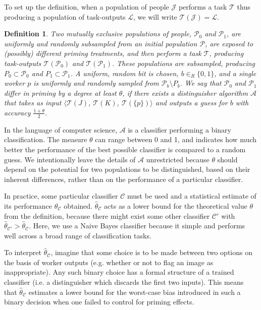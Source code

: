 \documentclass[letterpaper,twocolumn]{article}
\newtheorem*{mydef}{Definition}
\begin{document}
To set up the definition, when a population of people $\mathcal{J}$ performs
a task $\mathcal{T}$ thus producing a population of task-outputs $\mathcal{L}$,
we will write $\mathcal{T}(\mathcal{J}) = \mathcal{L}$.

\vspace{2mm}
\begin{mydef}
	\upshape
	Two mutually exclusive populations of people, $\mathcal{P}_0$ and 
	$\mathcal{P}_1$, are uniformly and randomly subsampled from an initial 
	population $\mathcal{P}$, are exposed to (possibly) different priming 
	treatments, and then perform a task $\mathcal{T}$, 
	producing task-outputs $\mathcal{T}(\mathcal{P}_0)$ and 
	$\mathcal{T}(\mathcal{P}_1)$.
	These populations are subsampled, producing 
	$P_0 \subset \mathcal{P}_0$ and
	$P_1 \subset \mathcal{P}_1$. A uniform, random bit is chosen, 
	$b\in _R \{0,1\}$, and a single worker $p$ is uniformly and randomly 
	sampled from 
	$\mathcal{P}_b \setminus P_b$.
	We say that $\mathcal{P}_0$ and $\mathcal{P}_1$ 
	\emph{differ in priming by a degree at least $\theta$},
	if there exists a \emph{distinguisher algorithm} $\mathcal{A}$ that takes as input 
	$\langle\mathcal{T}(J)$, $\mathcal{T}(K)$, $\mathcal{T}(\{p\})\rangle$
	and outputs a guess for $b$ with accuracy $\frac{1+\theta}{2}$.  
\end{mydef}

In the language of computer science, $\mathcal{A}$ is a classifier performing
a binary classification.  The measure $\theta$ can range between 0 and 1, and 
indicates how much better the performance of the best possible classifier is 
compared to a random guess. We intentionally leave the details of 
$\mathcal{A}$ unrestricted because $\theta$ should depend on the potential 
for two populations to be distinguished, based on their inherent differences, 
rather than on the performance of a particular classifier.

In practice, some particular classifier $\mathcal{C}$ must be used and a 
statistical estimate of its performance $\hat{\theta}_\mathcal{C}$ obtained. 
$\hat{\theta}_\mathcal{C}$ acts as a lower bound for the 
theoretical value $\theta$ from the definition, because there might 
exist some other classifier $\mathcal{C}'$ with 
$\hat{\theta}_\mathcal{C'}>\hat{\theta}_\mathcal{C}$.
Here, we use a Naive Bayes classifier because it simple and performs well 
across a broad range of classification tasks.

To interpret $\hat{\theta}_\mathcal{C}$, imagine that some choice is to be
made between two options on the basis of worker outputs (e.g. whether or not 
to flag an image as inappropriate). Any such binary choice has a formal 
structure of a trained classifier (i.e. a distinguisher which discards the 
first two inputs). This means that $\hat{\theta}_\mathcal{C}$ estimates a 
lower bound for the worst-case bias introduced in such a binary decision when 
one failed to control for priming effects.
\end{document}
